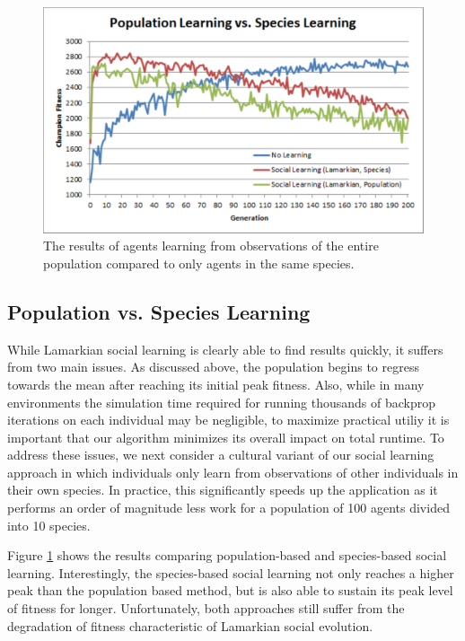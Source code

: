 \documentclass{acm_proc_article-sp}
\begin{document}
\begin{figure}
  \centering
    \includegraphics[scale=.35]{population_species.pdf}
  \caption{The results of agents learning from observations of the entire population compared to only agents in the same species.}
  \label{fig:population-species}
\end{figure}

\subsection*{Population vs. Species Learning}
While Lamarkian social learning is clearly able to find results quickly, it suffers from two main issues. As discussed above, the population begins to regress towards the mean after reaching its initial peak fitness. Also, while in many environments the simulation time required for running thousands of backprop iterations on each individual may be negligible, to maximize practical utiliy it is important that our algorithm minimizes its overall impact on total runtime. To address these issues, we next consider a cultural variant of our social learning approach in which individuals only learn from observations of other individuals in their own species. In practice, this significantly speeds up the application as it performs an order of magnitude less work for a population of 100 agents divided into 10 species.

Figure \ref{fig:population-species} shows the results comparing population-based and species-based social learning. Interestingly, the species-based social learning not only reaches a higher peak than the population based method, but is also able to sustain its peak level of fitness for longer. Unfortunately, both approaches still suffer from the degradation of fitness characteristic of Lamarkian social evolution.
\end{document}
